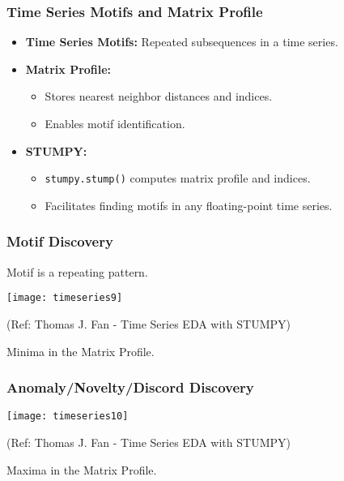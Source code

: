 \begin{frame}[fragile]\frametitle{Time Series Motifs and Matrix Profile}
    \begin{itemize}
        \item \textbf{Time Series Motifs:} Repeated subsequences in a time series.
        \item \textbf{Matrix Profile:} 
        \begin{itemize}
            \item Stores nearest neighbor distances and indices.
            \item Enables motif identification.
        \end{itemize}
        \item \textbf{STUMPY:} 
        \begin{itemize}
            \item \texttt{stumpy.stump()} computes matrix profile and indices.
            \item Facilitates finding motifs in any floating-point time series.
        \end{itemize}
    \end{itemize}
\end{frame}


\begin{frame}[fragile]\frametitle{Motif Discovery}

Motif is a repeating pattern.

\begin{center}
\texttt{[image: timeseries9]}

{\tiny (Ref: Thomas J. Fan - Time Series EDA with STUMPY)}		
\end{center}

Minima in the Matrix Profile.

\end{frame}

\begin{frame}[fragile]\frametitle{Anomaly/Novelty/Discord Discovery}

\begin{center}
\texttt{[image: timeseries10]}

{\tiny (Ref: Thomas J. Fan - Time Series EDA with STUMPY)}		
\end{center}

Maxima in the Matrix Profile.

\end{frame}

